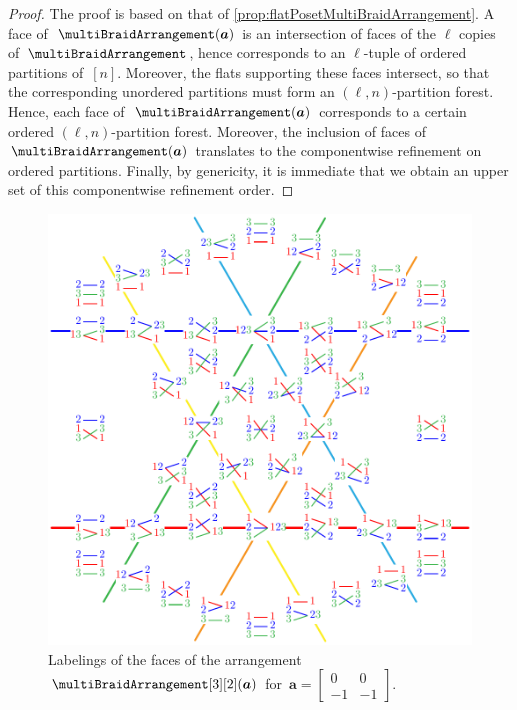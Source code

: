 \documentclass{amsart}
\theoremstyle{definition}
\renewcommand{\b}[1]{{\boldsymbol{#1}}} %
\renewcommand{\b}[1]{\boldsymbol{#1}} %
\begin{document}
\begin{proof}
The proof is based on that of \cref{prop:flatPosetMultiBraidArrangement}.
A face of~$\multiBraidArrangement(\b{a})$ is an intersection of faces of the $\ell$ copies of~$\multiBraidArrangement$, hence corresponds to an $\ell$-tuple of ordered partitions of~$[n]$.
Moreover, the flats supporting these faces intersect, so that the corresponding unordered partitions must form an $(\ell,n)$-partition forest.
Hence, each face of~$\multiBraidArrangement(\b{a})$ corresponds to a certain ordered $(\ell,n)$-partition forest.
Moreover, the inclusion of faces of~$\multiBraidArrangement(\b{a})$ translates to the componentwise refinement on ordered partitions.
Finally, by genericity, it is immediate that we obtain an upper set of this componentwise refinement order.
\end{proof}

\begin{figure}
	\centerline{\includegraphics[scale=.9]{B23a}}
	\caption{Labelings of the faces of the arrangement~$\multiBraidArrangement[3][2](\b{a})$ for~$\b{a} = \begin{bmatrix} 0 & 0 \\ -1 & -1 \end{bmatrix}$.}
	\label{fig:B23a}
\end{figure}
\end{document}
